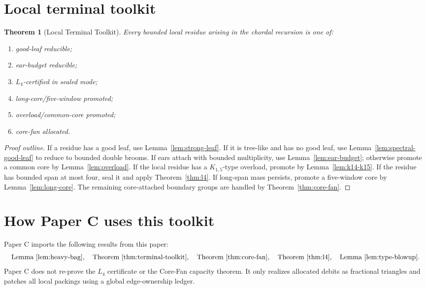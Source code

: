 \documentclass[11pt]{article}
\newtheorem{theorem}{Theorem}[section]
\theoremstyle{definition}
\begin{document}
\section{Local terminal toolkit}

\begin{theorem}[Local Terminal Toolkit]\label{thm:terminal-toolkit}
Every bounded local residue arising in the chordal recursion is one of:
\begin{enumerate}[label=(\roman*)]
    \item good-leaf reducible;
    \item ear-budget reducible;
    \item \(L_4\)-certified in sealed mode;
    \item long-core/five-window promoted;
    \item overload/common-core promoted;
    \item core-fan allocated.
\end{enumerate}
\end{theorem}

\begin{proof}[Proof outline]
If a residue has a good leaf, use Lemma~\ref{lem:strong-leaf}. If it is tree-like and has no good leaf, use Lemma~\ref{lem:spectral-good-leaf} to reduce to bounded double brooms. If ears attach with bounded multiplicity, use Lemma~\ref{lem:ear-budget}; otherwise promote a common core by Lemma~\ref{lem:overload}. If the local residue has a \(K_{1,5}\)-type overload, promote by Lemma~\ref{lem:k14-k15}. If the residue has bounded span at most four, seal it and apply Theorem~\ref{thm:l4}. If long-span mass persists, promote a five-window core by Lemma~\ref{lem:long-core}. The remaining core-attached boundary groups are handled by Theorem~\ref{thm:core-fan}.
\end{proof}

\section{How Paper C uses this toolkit}

Paper C imports the following results from this paper:
\[
    \text{Lemma~\ref{lem:heavy-bag}},
    \quad
    \text{Theorem~\ref{thm:terminal-toolkit}},
    \quad
    \text{Theorem~\ref{thm:core-fan}},
    \quad
    \text{Theorem~\ref{thm:l4}},
    \quad
    \text{Lemma~\ref{lem:type-blowup}}.
\]
Paper C does not re-prove the \(L_4\) certificate or the Core-Fan capacity theorem. It only realizes allocated debits as fractional triangles and patches all local packings using a global edge-ownership ledger.
\end{document}

